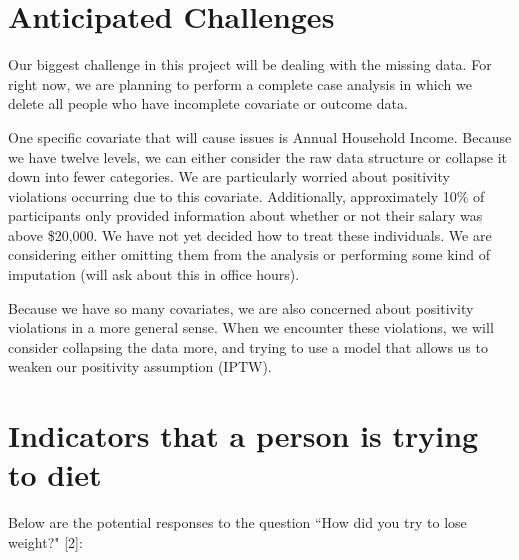 \documentclass{article}
\begin{document}
\section{Anticipated Challenges}

Our biggest challenge in this project will be dealing with the missing data.  For right now, we are planning to perform a complete case analysis in which we delete all people who have incomplete covariate or outcome data.

One specific covariate that will cause issues is Annual Household Income.  Because we have twelve levels, we can either consider the raw data structure or collapse it down into fewer categories. We are particularly worried about positivity violations occurring due to this covariate. Additionally, approximately 10\% of participants only provided information about whether or not their salary was above \$20,000. We have not yet decided how to treat these individuals. We are considering either omitting them from the analysis or performing some kind of imputation (will ask about this in office hours).

Because we have so many covariates, we are also concerned about positivity violations in a more general sense. When we encounter these violations, we will consider collapsing the data more, and trying to use a model that allows us to weaken our positivity assumption (IPTW).

\section{Indicators that a person is trying to diet}

Below are the potential responses to the question ``How did you try to lose weight?" [2]:
\end{document}
